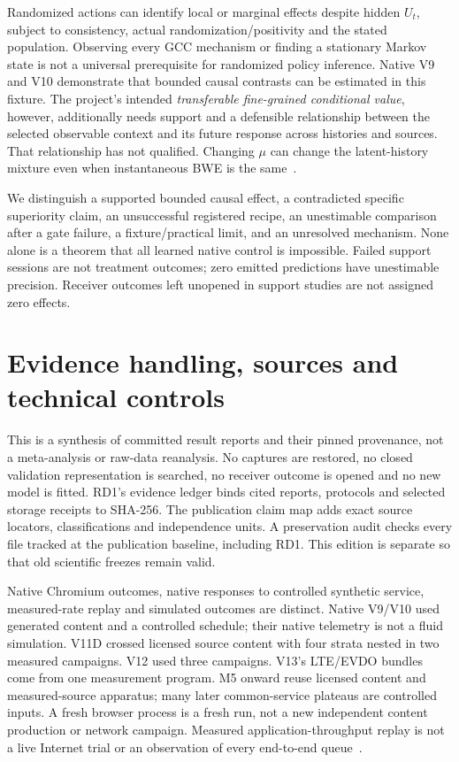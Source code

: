 \documentclass[10pt]{article}
\begin{document}
Randomized actions can identify local or marginal effects despite hidden
$U_t$, subject to consistency, actual randomization/positivity and the stated
population. Observing every GCC mechanism or finding a stationary Markov state
is not a universal prerequisite for randomized policy inference. Native V9 and
V10 demonstrate that bounded causal contrasts can be estimated in this fixture.
The project's intended \emph{transferable fine-grained conditional value},
however, additionally needs support and a defensible relationship between
the selected observable context and its future response across histories and
sources. That relationship has not qualified. Changing $\mu$ can change the
latent-history mixture even when instantaneous BWE is the same~\cite{rd1}.

We distinguish a supported bounded causal effect, a contradicted specific
superiority claim, an unsuccessful registered recipe, an unestimable comparison
after a gate failure, a fixture/practical limit, and an unresolved mechanism.
None alone is a theorem that all learned native control is impossible. Failed
support sessions are not treatment outcomes; zero emitted predictions have
unestimable precision. Receiver outcomes left unopened in support studies are
not assigned zero effects.

\section{Evidence handling, sources and technical controls}
\label{sec:evidence}
This is a synthesis of committed result reports and their pinned provenance,
not a meta-analysis or raw-data reanalysis. No captures are restored, no closed
validation representation is searched, no receiver outcome is opened and no
new model is fitted. RD1's evidence ledger binds cited reports, protocols and
selected storage receipts to SHA-256. The publication claim map adds exact
source locators, classifications and independence units. A preservation audit
checks every file tracked at the publication baseline, including RD1. This
edition is separate so that old scientific freezes remain valid.

Native Chromium outcomes, native responses to controlled synthetic service,
measured-rate replay and simulated outcomes are distinct. Native V9/V10 used
generated content and a controlled schedule; their native telemetry is not a
fluid simulation. V11D crossed licensed source content with four strata nested
in two measured campaigns. V12 used three campaigns. V13's LTE/EVDO bundles
come from one measurement program. M5 onward reuse licensed content and
measured-source apparatus; many later common-service plateaus are controlled
inputs. A fresh browser process is a fresh run, not a new independent content
production or network campaign. Measured application-throughput replay is not
a live Internet trial or an observation of every end-to-end queue~\cite{v9,v10,v11d,v12,v13,m5,m8,m9r}.
\end{document}
